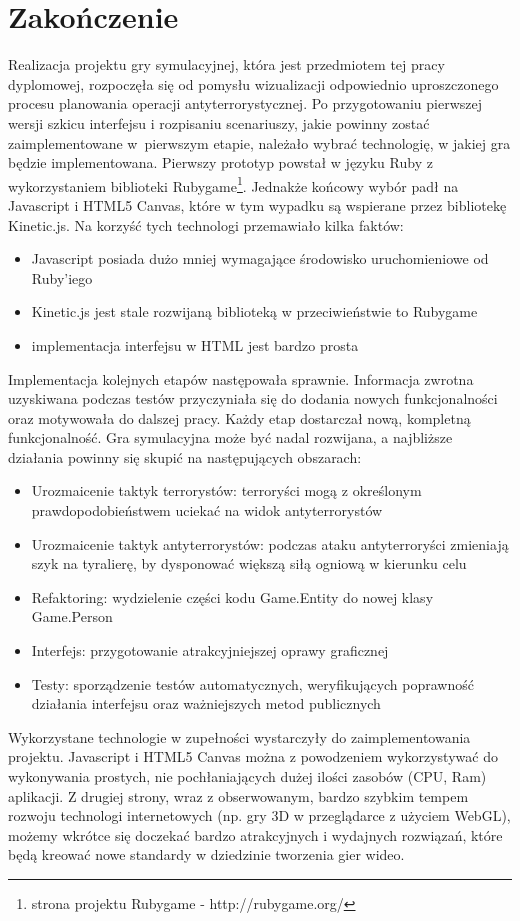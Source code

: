 \chapter*{Zakończenie}
Realizacja projektu gry symulacyjnej, która jest przedmiotem tej pracy dyplomowej, rozpoczęła się od pomysłu wizualizacji odpowiednio uproszczonego procesu planowania operacji antyterrorystycznej. Po przygotowaniu pierwszej wersji szkicu interfejsu i rozpisaniu scenariuszy, jakie powinny zostać zaimplementowane w~pierwszym etapie, należało wybrać technologię, w jakiej gra będzie implementowana. Pierwszy prototyp powstał w języku Ruby z wykorzystaniem biblioteki Rubygame\footnote{strona projektu Rubygame - http://rubygame.org/}. Jednakże końcowy wybór padł na Javascript i HTML5 Canvas, które w tym wypadku są wspierane przez bibliotekę Kinetic.js. Na korzyść tych technologi przemawiało kilka faktów: 
\begin{itemize}
	\item Javascript posiada dużo mniej wymagające środowisko uruchomieniowe od Ruby'iego
	\item Kinetic.js jest stale rozwijaną biblioteką w przeciwieństwie to Rubygame
	\item implementacja interfejsu w HTML jest bardzo prosta
\end{itemize}

Implementacja kolejnych etapów następowała sprawnie. Informacja zwrotna uzyskiwana podczas testów przyczyniała się do dodania nowych funkcjonalności oraz motywowała do dalszej pracy. Każdy etap dostarczał nową, kompletną funkcjonalność. Gra symulacyjna może być nadal rozwijana, a najbliższe działania powinny się skupić na następujących obszarach:
\begin{itemize}
	\item Urozmaicenie taktyk terrorystów: terroryści mogą z określonym prawdopodobieństwem uciekać na widok antyterrorystów
	\item Urozmaicenie taktyk antyterrorystów: podczas ataku antyterroryści zmieniają szyk na tyralierę, by dysponować większą siłą ogniową w kierunku celu
	\item Refaktoring: wydzielenie części kodu Game.Entity do nowej klasy Game.Person
	\item Interfejs: przygotowanie atrakcyjniejszej oprawy graficznej
	\item Testy: sporządzenie testów automatycznych, weryfikujących poprawność działania interfejsu oraz ważniejszych metod publicznych
\end{itemize}

Wykorzystane technologie w zupełności wystarczyły do zaimplementowania projektu. Javascript i HTML5 Canvas można z powodzeniem wykorzystywać do wykonywania prostych, nie pochłaniających dużej ilości zasobów (CPU, Ram) aplikacji. Z drugiej strony, wraz z obserwowanym, bardzo szybkim tempem rozwoju technologi internetowych (np. gry 3D w przeglądarce z użyciem WebGL), możemy wkrótce się doczekać bardzo atrakcyjnych i wydajnych rozwiązań, które będą kreować nowe standardy w dziedzinie tworzenia gier wideo.

